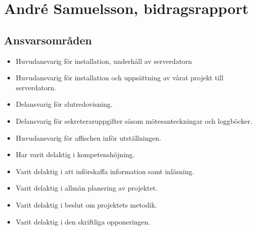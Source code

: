 
\section{André Samuelsson, bidragsrapport}
\subsection{Ansvarsområden}
\begin{itemize}
  \item Huvudansvarig för installation, underhåll av serverdatorn 
  \item Huvudansvarig för installation och uppsättning av vårat projekt till serverdatorn.
  \item Delansvarig för slutredovisning.
  \item Delansvarig för sekreteraruppgifter såsom mötesanteckningar och loggböcker.
  \item Huvudansvarig för affischen inför utställningen.
  
  \item Har varit delaktig i kompetenshöjning.
  \item Varit delaktig i att införskaffa information samt inläsning.
  \item Varit delaktig i allmän planering av projektet.
  \item Varit delaktig i beslut om projektets metodik.
  \item Varit delaktig i den skriftliga opponeringen.
\end{itemize}

